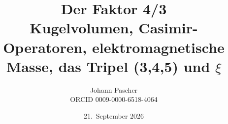 \documentclass[11pt,a4paper]{report}
\title{Der Faktor 4/3\\[0.5em]\large Kugelvolumen, Casimir-Operatoren, elektromagnetische Masse, das Tripel (3,4,5) und $\xi$}
\date{21.~September 2026}
\author{Johann Pascher\\\small ORCID 0009-0000-6518-4064}
\begin{document}
\renewcommand{\thechapter}{}
\renewcommand{\thesection}{\arabic{section}}
\maketitle
\tableofcontents

\end{document}
